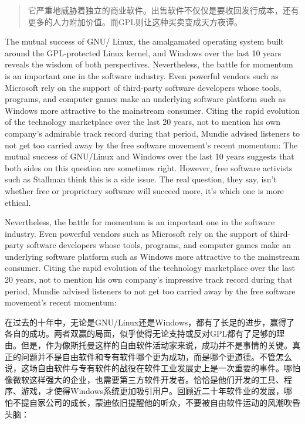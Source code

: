 \begin{quote}
它严重地威胁着独立的商业软件。出售软件不仅仅是要收回发行成本，还有更多的人力附加价值。而GPL则让这种买卖变成天方夜谭。
\end{quote}

\fi

\ifdefined\eng
\ifdefined\vone
The mutual success of GNU/ Linux, the amalgamated operating system built around the GPL-protected Linux kernel, and Windows over the last 10 years reveals the wisdom of both perspectives. Nevertheless, the battle for momentum is an important one in the software industry. Even powerful vendors such as Microsoft rely on the support of third-party software developers whose tools, programs, and computer games make an underlying software platform such as Windows more attractive to the mainstream consumer. Citing the rapid evolution of the technology marketplace over the last 20 years, not to mention his own company's admirable track record during that period, Mundie advised listeners to not get too carried away by the free software movement's recent momentum:
\fi
\ifdefined\vtwo
The mutual success of GNU/Linux and Windows over the last 10 years suggests that both sides on this question are sometimes right.  However, free software activists such as Stallman think this is a side issue. The real question, they say, isn't whether free or proprietary software will succeed more, it's which one is more ethical.

Nevertheless, the battle for momentum is an important one in the software industry. Even powerful vendors such as Microsoft rely on the support of third-party software developers whose tools, programs, and computer games make an underlying software platform such as Windows more attractive to the mainstream consumer. Citing the rapid evolution of the technology marketplace over the last 20 years, not to mention his own company's impressive track record during that period, Mundie advised listeners to not get too carried away by the free software movement's recent momentum:
\fi
\fi

\ifdefined\chs
在过去的十年中，无论是GNU/Linux还是Windows，都有了长足的进步，赢得了各自的成功。两者双赢的局面，似乎使得无论支持或反对GPL都有了足够的理由。但是，作为像斯托曼这样的自由软件活动家来说，成功并不是事情的关键。真正的问题并不是自由软件和专有软件哪个更为成功，而是哪个更道德。不管怎么说，这场自由软件与专有软件的战役在软件工业发展史上是一次重要的事件。哪怕像微软这样强大的企业，也需要第三方软件开发者。恰恰是他们开发的工具、程序、游戏，才使得Windows系统更加吸引用户。回顾近二十年软件业的发展，哪怕不提自家公司的成长，蒙迪依旧提醒他的听众，不要被自由软件运动的风潮吹昏头脑：
\fi

